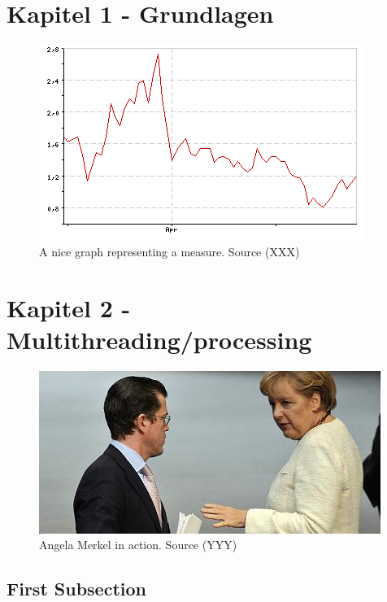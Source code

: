 \documentclass[12pt]{article}
\newcounter{savepage}
\begin{document}
\section{Kapitel 1 - Grundlagen}
\lipsum[1-2]
\begin{figure}[!h]
	\centering
	\includegraphics[scale=1.0]{Graph.png}
	\caption[A nice graph.]{A nice graph representing a measure. Source (XXX)}
\end{figure}
\cleardoublepage

\section{Kapitel 2 - Multithreading/processing}
\setcounter{figure}{0} %
\setcounter{table}{0} %
\lipsum[1]
\begin{figure}[!h]
	\centering
	\includegraphics[scale=1.0]{Merkel.png}
	\caption[A. Merkel]{Angela Merkel in action. Source (YYY)}
\end{figure}
\lipsum[2]
\subsection{First Subsection}
\lipsum[3]
\end{document}
